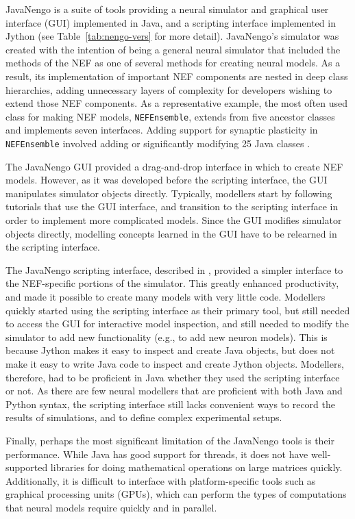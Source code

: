 \documentclass{frontiersSCNS}
\begin{document}
JavaNengo is a suite of tools providing
a neural simulator and graphical user interface (GUI)
implemented in Java,
and a scripting interface implemented in Jython
(see Table~\ref{tab:nengo-vers} for more detail).
JavaNengo's simulator was created
with the intention of being a general
neural simulator that included
the methods of the NEF
as one of several
methods for creating neural models.
As a result, its implementation
of important NEF components
are nested in deep class hierarchies,
adding unnecessary layers of complexity
for developers wishing
to extend those NEF components.
As a representative example,
the most often used class for making
NEF models, \texttt{NEFEnsemble},
extends from five ancestor classes
and implements seven interfaces.
Adding support for synaptic plasticity
in \texttt{NEFEnsemble}
involved adding or significantly modifying
25 Java classes \cite{TODO}.

The JavaNengo GUI provided
a drag-and-drop interface in which to create NEF models.
However, as it was developed
before the scripting interface,
the GUI manipulates simulator objects directly.
Typically, modellers start by following
tutorials that use the GUI interface,
and transition to the scripting interface
in order to implement more complicated models.
Since the GUI modifies simulator objects directly,
modelling concepts learned in the GUI
have to be relearned in the scripting interface.

The JavaNengo scripting interface,
described in \cite{TODO},
provided a simpler interface
to the NEF-specific portions of the simulator.
This greatly enhanced productivity,
and made it possible
to create many models with very little code.
Modellers quickly started using
the scripting interface
as their primary tool,
but still needed to access the GUI
for interactive model inspection,
and still needed to modify the simulator
to add new functionality
(e.g., to add new neuron models).
This is because Jython makes it easy
to inspect and create Java objects,
but does not make it easy to
write Java code to
inspect and create Jython objects.
Modellers, therefore, had to be
proficient in Java whether
they used the scripting interface or not.
As there are few neural modellers
that are proficient with both Java and Python syntax,
the scripting interface still lacks
convenient ways to record the results of simulations,
and to define complex experimental setups.

Finally, perhaps the most significant limitation
of the JavaNengo tools is their performance.
While Java has good support for threads,
it does not have well-supported libraries
for doing mathematical operations on large matrices quickly.
Additionally, it is difficult to interface with
platform-specific tools such as
graphical processing units (GPUs),
which can perform the types of computations
that neural models require quickly and in parallel.
\end{document}

